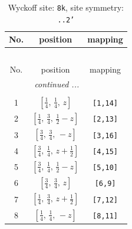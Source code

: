 \documentclass[fleqn,8pt]{jsarticle}
\begin{document}
\begin{longtable}{ccc}
\caption{Wyckoff site: {\tt 8k}, site symmetry: {\tt ..2'}}
 \\
 \hline \hline
No. & position & mapping \\ \hline \endfirsthead

\multicolumn{2}{l}{\tablename\ \thetable{}} \\
 \hline \hline
No. & position & mapping \\ \hline \endhead

 \hline \hline
\multicolumn{2}{r}{\footnotesize\it continued ...} \\ \endfoot

 \hline \hline
\multicolumn{2}{r}{} \\ \endlastfoot

1 & $\left[ \frac{1}{4},\, \frac{1}{4},\, z \right]$ & {\tt [1,14]} \\ \hline
2 & $\left[ \frac{1}{4},\, \frac{3}{4},\, \frac{1}{2} - z \right]$ & {\tt [2,13]} \\ \hline
3 & $\left[ \frac{3}{4},\, \frac{3}{4},\, - z \right]$ & {\tt [3,16]} \\ \hline
4 & $\left[ \frac{3}{4},\, \frac{1}{4},\, z + \frac{1}{2} \right]$ & {\tt [4,15]} \\ \hline
5 & $\left[ \frac{3}{4},\, \frac{1}{4},\, \frac{1}{2} - z \right]$ & {\tt [5,10]} \\ \hline
6 & $\left[ \frac{3}{4},\, \frac{3}{4},\, z \right]$ & {\tt [6,9]} \\ \hline
7 & $\left[ \frac{1}{4},\, \frac{3}{4},\, z + \frac{1}{2} \right]$ & {\tt [7,12]} \\ \hline
8 & $\left[ \frac{1}{4},\, \frac{1}{4},\, - z \right]$ & {\tt [8,11]} \\
\end{longtable}
\renewcommand{\arraystretch}{1.2}
\end{document}
